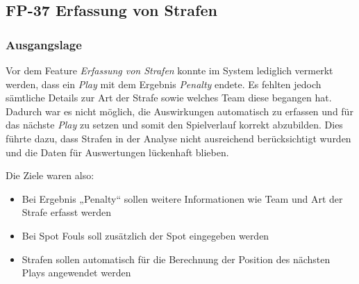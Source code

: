 \vspace*{0.5cm}
\subsection{FP-37 Erfassung von Strafen}
\subsubsection{Ausgangslage}
\vspace*{0.5cm}
Vor dem Feature \textit{Erfassung von Strafen} konnte im System lediglich vermerkt werden, dass ein \textit{Play} mit dem Ergebnis \textit{Penalty} endete. Es fehlten jedoch sämtliche Details zur Art der Strafe sowie welches Team diese begangen hat. Dadurch war es nicht möglich, die Auswirkungen automatisch zu erfassen und für das nächste \textit{Play} zu setzen und somit den Spielverlauf korrekt abzubilden. Dies führte dazu, dass Strafen in der Analyse nicht ausreichend berücksichtigt wurden und die Daten für Auswertungen lückenhaft blieben. 
\vspace*{0.5cm}

Die Ziele waren also:
\begin{itemize}
    \item Bei Ergebnis „Penalty“ sollen weitere Informationen wie Team und Art der Strafe erfasst werden
    \item Bei Spot Fouls soll zusätzlich der Spot eingegeben werden
    \item Strafen sollen automatisch für die Berechnung der Position des nächsten Plays angewendet werden
\end{itemize}
\vspace*{0.5cm}
